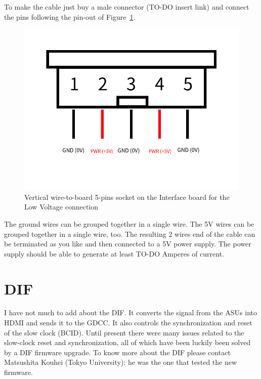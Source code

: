 To make the cable just buy a male connector (TO-DO insert link) and
connect the pins following the pin-out of
Figure~\ref{low-vol-pin-out}.
\begin{figure}[H]
  \centering \includegraphics[width=0.5\linewidth]{low-vol-pin-out}
  \caption{Vertical wire-to-board 5-pins socket on the Interface board
    for the Low Voltage connection}\label{low-vol-pin-out}
\end{figure}
The ground wires can be grouped together in a single wire. The 5V
wires can be grouped together in a single wire, too. The resulting 2
wires end of the cable can be terminated as you like and then
connected to a 5V power supply. The power supply should be able to
generate at least TO-DO Amperes of current.
  
\section{DIF}
I have not much to add about the DIF. It converts the signal from the ASUs into
HDMI and sends it to the GDCC. It also controls the synchronization and reset of
the slow clock (BCID). Until present there were many issues related to the
slow-clock reset and synchronization, all of which have been luckily been solved
by a DIF firmware upgrade. To know more about the DIF please contact Matsushita
Kouhei (Tokyo University): he was the one that tested the new firmware.

